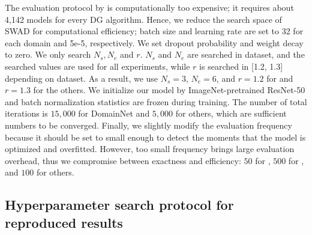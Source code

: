 The evaluation protocol by \citet{gulrajani2020domainbed} is computationally too expensive; it requires about 4,142 models for every DG algorithm.
Hence, we reduce the search space of SWAD for computational efficiency; batch size and learning rate are set to 32 for each domain and 5e-5, respectively. We set dropout probability and weight decay to zero.
We only search $N_s, N_e$ and $r$. $N_s$ and $N_e$ are searched in  dataset, and the searched values are used for all experiments, while $r$ is searched in [1.2, 1.3] depending on dataset.
As a result, we use $N_s=3$, $N_e=6$, and $r=1.2$ for  and $r=1.3$ for the others.
We initialize our model by ImageNet-pretrained ResNet-50 and batch normalization statistics are frozen during training.
The number of total iterations is $15,000$ for DomainNet and $5,000$ for others, which are sufficient numbers to be converged. 
Finally, we slightly modify the evaluation frequency because it should be set to small enough to detect the moments that the model is optimized and overfitted. However, too small frequency brings large evaluation overhead, thus we compromise between exactness and efficiency: $50$ for , $500$ for , and $100$ for others.

\subsection{Hyperparameter search protocol for reproduced results}

